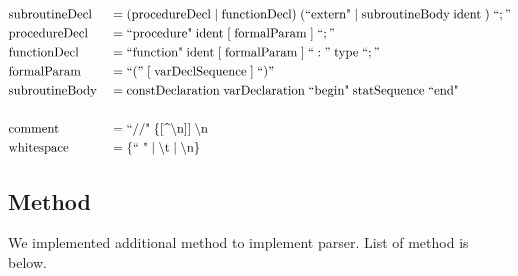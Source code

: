 \documentclass[12pt]{article}
\begin{document}
{\begin{align*}
    &\text{subroutineDecl} &&= ( \text{procedureDecl} \; | \; \text{functionDecl} ) \; ( \text{``extern"} \; | \; \text{subroutineBody} \; \text{ident} \; ) \; ``;" \\
    &\text{procedureDecl} &&= \text{``procedure"} \; \text{ident} \; [ \; \text{formalParam} \; ] \; ``;" \\
    &\text{functionDecl} &&= \text{``function"} \; \text{ident} \; [ \; \text{formalParam} \; ] \; ``:" \; \text{type} \; ``;" \\
    &\text{formalParam} &&= ``(" \; [ \; \text{varDeclSequence} \; ] \; ``)" \\
    &\text{subroutineBody} &&= \text{constDeclaration} \; \text{varDeclaration} \; \text{``begin"} \; \text{statSequence} \; \text{``end"} \\ \\
    &\text{comment} &&= \text{``//"} \; \{ \text{[} \text{\textasciicircum \textbackslash n]} \text{]} \; \text{\textbackslash n} \\
    &\text{whitespace} &&= \{ \text{`` "} \; | \; \text{\textbackslash t} \; | \; \text{\textbackslash n} \} \\
\end{align*}    
}
\subsection{Method}
We implemented additional method to implement parser.
List of method is below.
\end{document}
